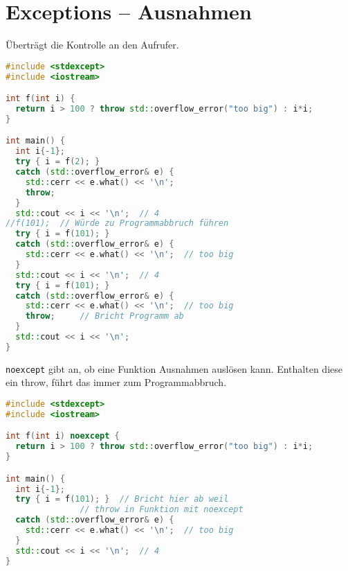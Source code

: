 \section{Exceptions -- Ausnahmen}

Überträgt die Kontrolle an den Aufrufer.

\begin{lstlisting}[language=C++]
#include <stdexcept>
#include <iostream>

int f(int i) {
  return i > 100 ? throw std::overflow_error("too big") : i*i;
}

int main() {
  int i{-1};
  try { i = f(2); }
  catch (std::overflow_error& e) {
    std::cerr << e.what() << '\n';
    throw;
  }
  std::cout << i << '\n';  // 4
//f(101);  // Würde zu Programmabbruch führen
  try { i = f(101); }
  catch (std::overflow_error& e) {
    std::cerr << e.what() << '\n';  // too big
  }
  std::cout << i << '\n';  // 4
  try { i = f(101); }
  catch (std::overflow_error& e) {
    std::cerr << e.what() << '\n';  // too big
    throw;     // Bricht Programm ab
  }
  std::cout << i << '\n';
}
\end{lstlisting}

\lstinline|noexcept| gibt an, ob eine Funktion Ausnahmen auslösen kann. Enthalten diese ein throw, führt das immer zum Programmabbruch.

\begin{lstlisting}[language=C++]
#include <stdexcept>
#include <iostream>

int f(int i) noexcept {
  return i > 100 ? throw std::overflow_error("too big") : i*i;
}

int main() {
  int i{-1};
  try { i = f(101); }  // Bricht hier ab weil
               // throw in Funktion mit noexcept
  catch (std::overflow_error& e) {
    std::cerr << e.what() << '\n';  // too big
  }
  std::cout << i << '\n';  // 4
}
\end{lstlisting}